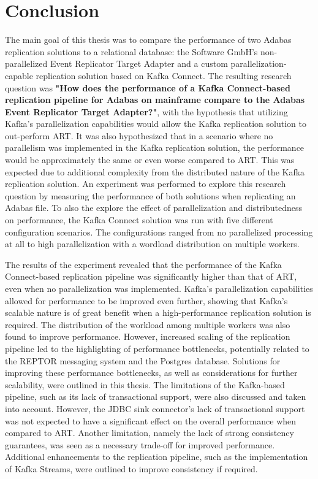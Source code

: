 \chapter{Conclusion}
\label{ch08:conclusion}
The main goal of this thesis was to compare the performance of two Adabas replication solutions to a relational database: the Software GmbH's non-parallelized Event Replicator Target Adapter and a custom parallelization-capable replication solution based on Kafka Connect. The resulting research question was \textbf{"How does the performance of a Kafka Connect-based replication pipeline for Adabas on mainframe compare to the Adabas Event Replicator Target Adapter?"}, with the hypothesis that utilizing Kafka's parallelization capabilities would allow the Kafka replication solution to out-perform \ac{ART}. It was also hypothesized that in a scenario where no parallelism was implemented in the Kafka replication solution, the performance would be approximately the same or even worse compared to \ac{ART}. This was expected due to additional complexity from the distributed nature of the Kafka replication solution. An experiment was performed to explore this research question by measuring the performance of both solutions when replicating an Adabas file. To also the explore the effect of parallelization and distributedness on performance, the Kafka Connect solution was run with five different configuration scenarios. The configurations ranged from no parallelized processing at all to high parallelization with a wordload distribution on multiple workers.

The results of the experiment revealed that the performance of the Kafka Connect-based replication pipeline was significantly higher than that of \ac{ART}, even when no parallelization was implemented. Kafka's parallelization capabilities allowed for performance to be improved even further, showing that Kafka's scalable nature is of great benefit when a high-performance replication solution is required. The distribution of the workload among multiple workers was also found to improve performance. However, increased scaling of the replication pipeline led to the highlighting of performance bottlenecks, potentially related to the \ac{REPTOR} messaging system and the Postgres database. Solutions for improving these performance bottlenecks, as well as considerations for further scalability, were outlined in this thesis. The limitations of the Kafka-based pipeline, such as its lack of transactional support, were also discussed and taken into account. However, the \ac{JDBC} sink connector's lack of transactional support was not expected to have a significant effect on the overall performance when compared to \ac{ART}. Another limitation, namely the lack of strong consistency guarantees, was seen as a necessary trade-off for improved performance. Additional enhancements to the replication pipeline, such as the implementation of Kafka Streams, were outlined to improve consistency if required.

